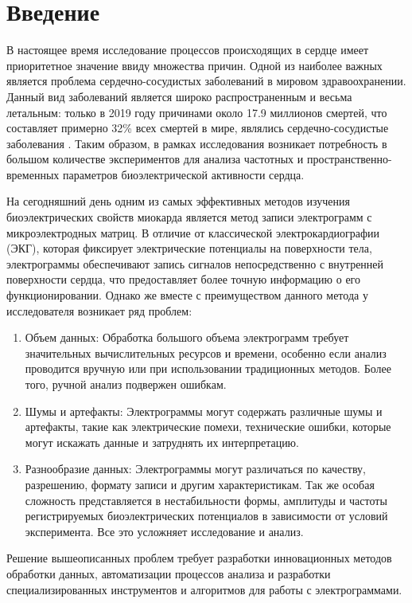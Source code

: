 \chapter{Введение}
В настоящее время исследование процессов происходящих в сердце имеет
приоритетное значение ввиду множества причин. Одной из наиболее важных является
проблема сердечно-сосудистых заболеваний в мировом здравоохранении. Данный вид
заболеваний является широко распространенным и весьма летальным: только в 2019
году причинами около 17.9 миллионов смертей, что составляет примерно 32\% всех
смертей в мире, являлись сердечно-сосудистые заболевания \cite{who}. Таким
образом, в рамках исследования возникает потребность в большом количестве
экспериментов для анализа частотных и пространственно-временных параметров
биоэлектрической активности сердца.

На сегодняшний день одним из самых эффективных методов изучения
биоэлектрических свойств миокарда является метод записи электрограмм с
микроэлектродных матриц. В отличие от классической электрокардиографии (ЭКГ),
которая фиксирует электрические потенциалы на поверхности тела, электрограммы
обеспечивают запись сигналов непосредственно с внутренней поверхности сердца,
что предоставляет более точную информацию о его функционировании. Однако же
вместе с преимуществом данного метода у исследователя возникает ряд проблем:

\begin{enumerate}
	\item Объем данных: Обработка большого объема электрограмм требует
	значительных вычислительных ресурсов и времени, особенно если анализ
	проводится вручную или при использовании традиционных методов. Более того,
	ручной анализ подвержен ошибкам.

	\item Шумы и артефакты: Электрограммы могут содержать различные шумы и
	артефакты, такие как электрические помехи, технические ошибки, которые
	могут искажать данные и затруднять их интерпретацию.

	\item Разнообразие данных: Электрограммы могут различаться по качеству,
	разрешению, формату записи и другим характеристикам. Так же особая
	сложность представляется в нестабильности формы, амплитуды и частоты
	регистрируемых биоэлектрических потенциалов в зависимости от условий
	эксперимента. Все это усложняет исследование и анализ.
\end{enumerate}

Решение вышеописанных проблем требует разработки инновационных методов обработки данных,
автоматизации процессов анализа и разработки специализированных инструментов и
алгоритмов для работы с электрограммами.

